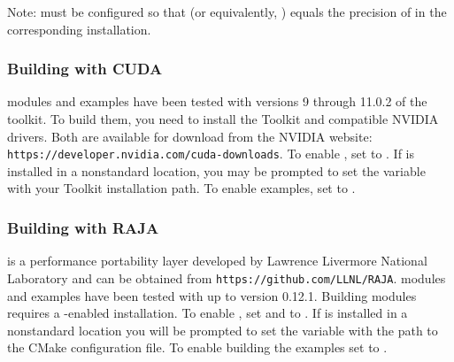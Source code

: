 Note: {\sundials} must be configured so that  (or
equivalently, ) equals the precision of
 in the corresponding {\hypre} installation.


\subsubsection*{Building with CUDA}
{\sundials} {\cuda} modules and examples have been tested with versions 9
through 11.0.2 of the {\cuda} toolkit. To build them, you need to install the
Toolkit and compatible NVIDIA drivers. Both are available for download from the
NVIDIA website: {\tt https://developer.nvidia.com/cuda-downloads}. To enable
{\cuda}, set  to . If {\cuda} is installed in a
nonstandard location, you may be prompted to set the variable
 with your {\cuda} Toolkit installation path. To
enable {\cuda} examples, set  to .

\subsubsection*{Building with RAJA}
{\raja} is a performance portability layer developed by Lawrence Livermore
National Laboratory and can be obtained from {\tt https://github.com/LLNL/RAJA}.
{\sundials} {\raja} modules and examples have been tested with {\raja} up to
version 0.12.1. Building {\sundials} {\raja} modules requires a {\cuda}-enabled
{\raja} installation. To enable {\raja}, set  and
 to . If {\raja} is installed in a nonstandard location
you will be prompted to set the variable  with the path to the
{\raja} CMake configuration file. To enable building the {\raja} examples set
 to .

